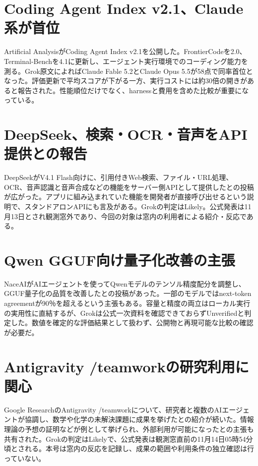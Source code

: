 \section{Coding Agent Index v2.1、Claude系が首位}
Artificial AnalysisがCoding Agent Index v2.1を公開した。FrontierCodeを2.0、Terminal-Benchを4.1に更新し、エージェント実行環境でのコーディング能力を測る。Grok原文によればClaude Fable 5.2とClaude Opus 5.5が58点で同率首位となった。評価更新で平均スコアが下がる一方、実行コストには約30倍の開きがあると報告された。性能順位だけでなく、harnessと費用を含めた比較が重要になっている。

\section{DeepSeek、検索・OCR・音声をAPI提供との報告}
DeepSeekがV4.1 Flash向けに、引用付きWeb検索、ファイル・URL処理、OCR、音声認識と音声合成などの機能をサーバー側APIとして提供したとの投稿が広がった。アプリに組み込まれていた機能を開発者が直接呼び出せるという説明で、スタンドアロンAPIにも言及がある。Grokの判定はLikely。公式発表は11月13日とされ観測窓外であり、今回の対象は窓内の利用者による紹介・反応である。

\section{Qwen GGUF向け量子化改善の主張}
NaceAIがAIエージェントを使ってQwenモデルのテンソル精度配分を調整し、GGUF量子化の品質を改善したとの投稿があった。一部のモデルではnext-token agreementが90％を超えるという主張もある。容量と精度の両立はローカル実行の実用性に直結するが、Grokは公式一次資料を確認できておらずUnverifiedと判定した。数値を確定的な評価結果として扱わず、公開物と再現可能な比較の確認が必要だ。

\section{Antigravity /teamworkの研究利用に関心}
Google ResearchのAntigravity /teamworkについて、研究者と複数のAIエージェントが協調し、数学や化学の未解決課題に成果を挙げたとの紹介が続いた。情報理論の予想の証明などが例として挙げられ、外部利用が可能になったとの主張も共有された。Grokの判定はLikelyで、公式発表は観測窓直前の11月14日05時54分頃とされる。本号は窓内の反応を記録し、成果の範囲や利用条件の独立確認は行っていない。

